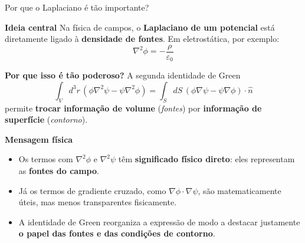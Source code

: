 \documentclass[aspectratio=169]{beamer}
\begin{document}
\begin{frame}{Por que o Laplaciano é tão importante?}
\small

\begin{block}{\textbf{Ideia central}}
Na física de campos, o \textbf{Laplaciano de um potencial} está diretamente ligado à
\textbf{densidade de fontes}. Em eletrostática, por exemplo:
\begin{equation}
\nabla^2 \phi = -\frac{\rho}{\varepsilon_0}
\label{eq:poisson}
\end{equation}
\end{block}

\vspace{0.2cm}

\begin{alertblock}{\textbf{Por que isso é tão poderoso?}}
A segunda identidade de Green
\begin{equation}
\int_V d^3r\,\left(\phi \nabla^2\psi - \psi \nabla^2\phi\right)
=
\int_S dS\,\left(\phi \nabla\psi - \psi \nabla\phi\right)\cdot\hat{n}
\label{eq:green2}
\end{equation}
permite \textbf{trocar informação de volume} (\emph{fontes}) por
\textbf{informação de superfície} (\emph{contorno}).
\end{alertblock}

\end{frame}

\begin{frame}


\begin{exampleblock}{\textbf{Mensagem física}}
\begin{itemize}
    \item Os termos com \(\nabla^2\phi\) e \(\nabla^2\psi\) têm \textbf{significado físico direto}:
    eles representam as \textbf{fontes do campo}.
    \item Já os termos de gradiente cruzado, como \(\nabla\phi\cdot\nabla\psi\), são
    matematicamente úteis, mas menos transparentes fisicamente.
    \item A identidade de Green reorganiza a expressão de modo a destacar justamente
    \textbf{o papel das fontes e das condições de contorno}.
\end{itemize}
\end{exampleblock}

\end{frame}
\end{document}
